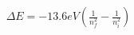 \documentclass[preview]{standalone}
\begin{document}
\begin{align*}
\Delta E = -13.6eV \left( \frac{1}{n^2_{f}}-\frac{1}{n_{i}^2} \right)
\end{align*}
\end{document}
